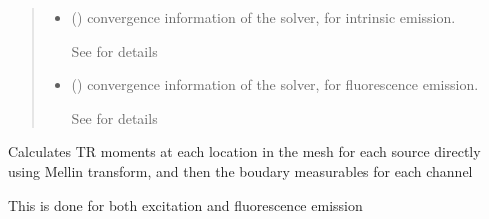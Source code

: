 \documentclass[letterpaper,10pt,english]{sphinxmanual}
\begin{document}
\begin{fulllineitems}
\begin{fulllineitems}
\begin{quote}
\begin{description}
\begin{itemize}
\item {} 
\sphinxAtStartPar
{} () \textendash{} convergence information of the solver, for intrinsic emission.

\sphinxAtStartPar
See {\hyperref[\detokenize{_autosummary/nirfasterff.utils.ConvergenceInfo:nirfasterff.utils.ConvergenceInfo}]{}} for details

\item {} 
\sphinxAtStartPar
{} () \textendash{} convergence information of the solver, for fluorescence emission.

\sphinxAtStartPar
See {\hyperref[\detokenize{_autosummary/nirfasterff.utils.ConvergenceInfo:nirfasterff.utils.ConvergenceInfo}]{}} for details

\end{itemize}


\end{description}\end{quote}

\end{fulllineitems}


\begin{fulllineitems}
\label{\detokenize{_autosummary/nirfasterff.base.fluor_mesh.fluormesh:nirfasterff.base.fluor_mesh.fluormesh.femdata_moments}}
\pysigstartsignatures
{}
\pysigstopsignatures
\sphinxAtStartPar
Calculates TR moments at each location in the mesh for each source directly using Mellin transform, and then the boudary measurables for each channel

\sphinxAtStartPar
This is done for both excitation and fluorescence emission


\end{fulllineitems}
\end{fulllineitems}
\end{document}
